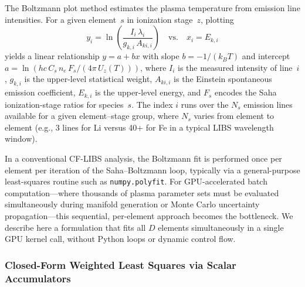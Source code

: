 The Boltzmann plot method \citep{Tognoni2010} estimates the plasma temperature from emission line intensities.
For a given element~$s$ in ionization stage~$z$, plotting
\begin{equation}
  y_i = \ln\!\left(\frac{I_i \,\lambda_i}{g_{k,i}\, A_{ki,i}}\right)
  \quad \text{vs.} \quad
  x_i = E_{k,i}
  \label{eq:boltzmann-plot}
\end{equation}
yields a linear relationship $y = a + bx$ with slope $b = -1/(k_B T)$ and intercept $a = \ln(hc\, C_s\, n_e\, F_s / (4\pi\, U_z(T)))$, where $I_i$ is the measured intensity of line~$i$, $g_{k,i}$ is the upper-level statistical weight, $A_{ki,i}$ is the Einstein spontaneous emission coefficient, $E_{k,i}$ is the upper-level energy, and $F_s$ encodes the Saha ionization-stage ratios for species~$s$.
The index $i$ runs over the $N_s$ emission lines available for a given element--stage group, where $N_s$ varies from element to element (e.g., 3 lines for Li versus 40+ for Fe in a typical LIBS wavelength window).

In a conventional CF-LIBS analysis, the Boltzmann fit is performed once per element per iteration of the Saha--Boltzmann loop, typically via a general-purpose least-squares routine such as \texttt{numpy.polyfit}.
For GPU-accelerated batch computation---where thousands of plasma parameter sets must be evaluated simultaneously during manifold generation or Monte Carlo uncertainty propagation---this sequential, per-element approach becomes the bottleneck.
We describe here a formulation that fits all $D$ elements simultaneously in a single GPU kernel call, without Python loops or dynamic control flow.

\subsubsection{Closed-Form Weighted Least Squares via Scalar Accumulators}
\label{sec:boltzmann-wls}

